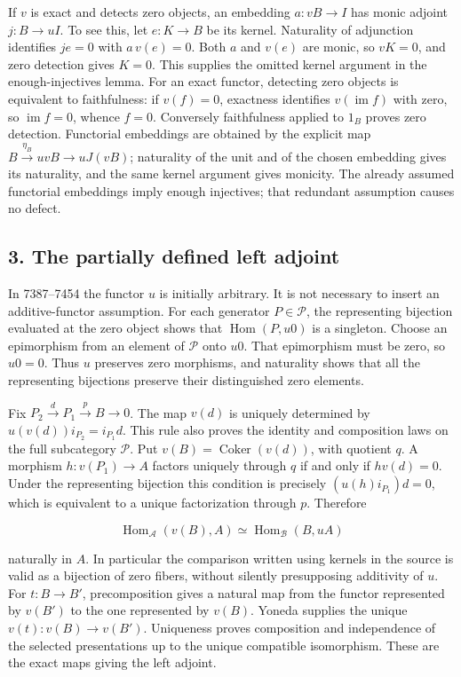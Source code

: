 \documentclass[11pt]{article}
\begin{document}
If \(v\) is exact and detects zero objects, an embedding \(a:vB\to I\) has monic adjoint \(j:B\to uI\). To see this, let \(e:K\to B\) be its kernel. Naturality of adjunction identifies \(je=0\) with \(a\,v(e)=0\). Both \(a\) and \(v(e)\) are monic, so \(vK=0\), and zero detection gives \(K=0\). This supplies the omitted kernel argument in the enough-injectives lemma. For an exact functor, detecting zero objects is equivalent to faithfulness: if \(v(f)=0\), exactness identifies \(v(\operatorname{im}f)\) with zero, so \(\operatorname{im}f=0\), whence \(f=0\). Conversely faithfulness applied to \(1_B\) proves zero detection. Functorial embeddings are obtained by the explicit map \(B\xrightarrow{\eta_B}uvB\to uJ(vB)\); naturality of the unit and of the chosen embedding gives its naturality, and the same kernel argument gives monicity. The already assumed functorial embeddings imply enough injectives; that redundant assumption causes no defect.

\subsection{3. The partially defined left adjoint}\label{note-09-the-partially-defined-left-adjoint}

In 7387--7454 the functor \(u\) is initially arbitrary. It is not necessary to insert an additive-functor assumption. For each generator \(P\in\mathcal P\), the representing bijection evaluated at the zero object shows that \(\operatorname{Hom}(P,u0)\) is a singleton. Choose an epimorphism from an element of \(\mathcal P\) onto \(u0\). That epimorphism must be zero, so \(u0=0\). Thus \(u\) preserves zero morphisms, and naturality shows that all the representing bijections preserve their distinguished zero elements.

Fix \(P_2\xrightarrow d P_1\xrightarrow p B\to0\). The map \(v(d)\) is uniquely determined by \(u(v(d))i_{P_2}=i_{P_1}d\). This rule also proves the identity and composition laws on the full subcategory \(\mathcal P\). Put \(v(B)=\operatorname{Coker}(v(d))\), with quotient \(q\). A morphism \(h:v(P_1)\to A\) factors uniquely through \(q\) if and only if \(h v(d)=0\). Under the representing bijection this condition is precisely \((u(h)i_{P_1})d=0\), which is equivalent to a unique factorization through \(p\). Therefore

\[
\operatorname{Hom}_{\mathcal A}(v(B),A)
\simeq \operatorname{Hom}_{\mathcal B}(B,uA)
\]

naturally in \(A\). In particular the comparison written using kernels in the source is valid as a bijection of zero fibers, without silently presupposing additivity of \(u\). For \(t:B\to B'\), precomposition gives a natural map from the functor represented by \(v(B')\) to the one represented by \(v(B)\). Yoneda supplies the unique \(v(t):v(B)\to v(B')\). Uniqueness proves composition and independence of the selected presentations up to the unique compatible isomorphism. These are the exact maps giving the left adjoint.
\end{document}
